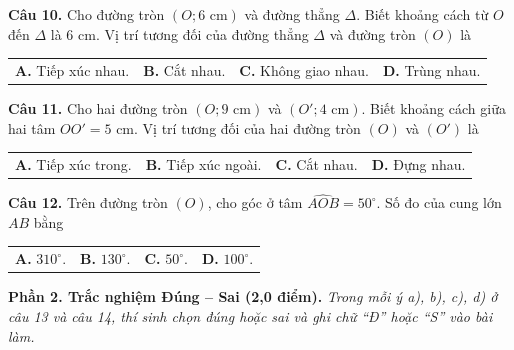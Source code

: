 \documentclass[11pt,a4paper]{article}
\begin{document}
\vspace{1.5mm}
\textbf{Câu 10.} Cho đường tròn $(O; 6\text{ cm})$ và đường thẳng $\Delta$. Biết khoảng cách từ $O$ đến $\Delta$ là $6\text{ cm}$. Vị trí tương đối của đường thẳng $\Delta$ và đường tròn $(O)$ là\\
\begin{tabularx}{\linewidth}{XXXX}
\textbf{A.} Tiếp xúc nhau. & \textbf{B.} Cắt nhau. & \textbf{C.} Không giao nhau. & \textbf{D.} Trùng nhau.
\end{tabularx}

\vspace{1.5mm}
\textbf{Câu 11.} Cho hai đường tròn $(O; 9\text{ cm})$ và $(O'; 4\text{ cm})$. Biết khoảng cách giữa hai tâm $OO' = 5\text{ cm}$. Vị trí tương đối của hai đường tròn $(O)$ và $(O')$ là\\
\begin{tabularx}{\linewidth}{XXXX}
\textbf{A.} Tiếp xúc trong. & \textbf{B.} Tiếp xúc ngoài. & \textbf{C.} Cắt nhau. & \textbf{D.} Đựng nhau.
\end{tabularx}

\vspace{1.5mm}
\textbf{Câu 12.} Trên đường tròn $(O)$, cho góc ở tâm $\widehat{AOB} = 50^\circ$. Số đo của cung lớn $AB$ bằng\\
\begin{tabularx}{\linewidth}{XXXX}
\textbf{A.} $310^\circ$. & \textbf{B.} $130^\circ$. & \textbf{C.} $50^\circ$. & \textbf{D.} $100^\circ$.
\end{tabularx}

\vspace{3mm}
\noindent
\textbf{Phần 2. Trắc nghiệm Đúng -- Sai (2,0 điểm).} \textit{Trong mỗi ý a), b), c), d) ở câu 13 và câu 14, thí sinh chọn đúng hoặc sai và ghi chữ ``Đ'' hoặc ``S'' vào bài làm.}
\end{document}
